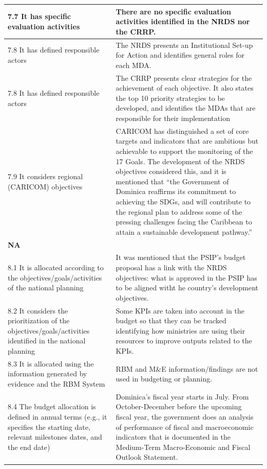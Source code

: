 \documentclass[
  10pt,
]{book}
\begin{document}
\begin{table}
\begin{tabular}[t]{l|l}
\hline
\hspace{1em}7.7 It has specific evaluation activities & There are no specific evaluation activities identified in the NRDS nor the CRRP.\\
\hline
\hspace{1em}7.8 It has defined responsible actors & The NRDS presents an Institutional Set-up for Action and identifies general roles for each MDA.\\
\hline
\hspace{1em}7.8 It has defined responsible actors & The CRRP presents clear strategies for the achievement of each objective. It also states the top 10 priority strategies to be developed, and identifies the MDAs that are responsible for their implementation\\
\hline
\hspace{1em}7.9 It considers regional (CARICOM) objectives & CARICOM has distinguished a set of core targets and indicators that are ambitious but achievable to support the monitoring of the 17 Goals. The development of the NRDS objectives considered this, and it is mentioned that “the Government of Dominica reaffirms its commitment to achieving the SDGs, and will contribute to the regional plan to address some of the pressing challenges facing the Caribbean to attain a sustainable development pathway.”\\
\hline
\multicolumn{2}{l}{\textbf{NA}}\\
\hline
\hspace{1em}8.1 It is allocated according to the objectives/goals/activities of the national planning & It was mentioned that the PSIP’s budget proposal has a link with the NRDS objectives: what is approved in the PSIP has to be aligned witht he country’s development objectives.\\
\hline
\hspace{1em}8.2 It considers the prioritization of the objectives/goals/activities identified in the national planning & Some KPIs are taken into account in the budget so that they can be tracked identifying how ministries are using their resources to improve outputs related to the KPIs.\\
\hline
\hspace{1em}8.3 It is allocated using the information generated by evidence and the RBM System & RBM and M\&E information/findings are not used in budgeting or planning.\\
\hline
\hspace{1em}8.4 The budget allocation is defined in annual terms (e.g., it specifies the starting date, relevant milestones dates, and the end date) & Dominica’s fiscal year starts in July. From October-December before the upcoming fiscal year, the government does an analysis of performance of fiscal and macroeconomic indicators that is documented in the Medium-Term Macro-Economic and Fiscal Outlook Statement.\\

\end{tabular}
\end{table}
\end{document}
